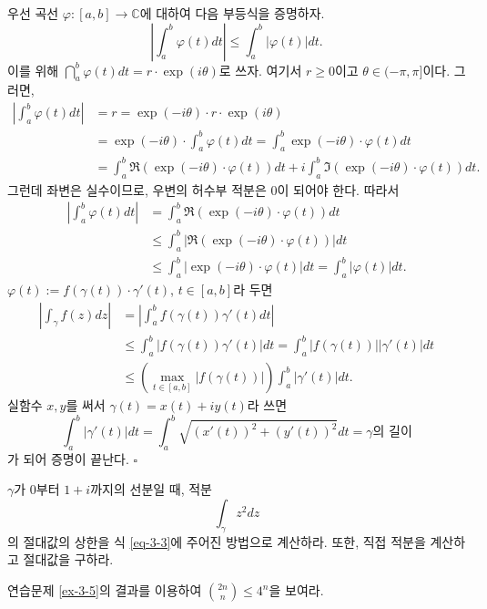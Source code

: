 우선 곡선 $\varphi : [a,b] \to \mathbb C$에 대하여 다음 부등식을 증명하자.
\[
\left| \int_a^b \varphi(t)dt \right|
\le \int_a^b |\varphi(t)|dt.
\]
이를 위해 $\dint_a^b \varphi(t) dt = r\cdot \exp(i\theta)$로 쓰자.
여기서 $r\ge 0$이고 $\theta \in (-\pi, \pi]$이다.
그러면,
\begin{align*}
\left| \int_a^b \varphi(t)dt \right|
&= r = \exp(-i\theta)\cdot r \cdot \exp(i\theta) \\
&= \exp(-i\theta) \cdot \int_a^b \varphi(t)dt
= \int_a^b \exp(-i\theta) \cdot \varphi(t)dt \\
&= \int_a^b \Re(\exp(-i\theta)\cdot\varphi(t))dt
+ i \int_a^b \Im(\exp(-i\theta)\cdot\varphi(t))dt.
\end{align*}
그런데 좌변은 실수이므로, 우변의 허수부 적분은 $0$이 되어야 한다.
따라서 
\begin{align*}
\left| \int_a^b \varphi(t)dt \right|
&= \int_a^b \Re(\exp(-i\theta)\cdot\varphi(t))dt \\
&\le \int_a^b |\Re(\exp(-i\theta)\cdot\varphi(t))|dt \\
&\le \int_a^b | \exp(-i\theta) \cdot \varphi(t)| dt
= \int_a^b |\varphi(t)| dt. 
\end{align*}
$\varphi(t) := f(\gamma(t))\cdot \gamma'(t)$, $t\in[a,b]$라 두면
\begin{align*}
\left| \int_\gamma f(z)dz \right| 
&= \left| \int_a^b f(\gamma(t)) \gamma'(t) dt \right| \\
&\le \int_a^b |f(\gamma(t)) \gamma'(t)| dt
= \int_a^b |f(\gamma(t))| | \gamma'(t)| dt \\
&\le \left( \max_{t\in[a,b]} |f(\gamma(t))| \right) 
\int_a^b |\gamma'(t)|dt.
\end{align*}
실함수 $x, y$를 써서  $\gamma(t) = x(t) + iy(t)$라 쓰면
\[
\int_a^b |\gamma'(t)|dt 
= \int_a^b  \sqrt{ (x'(t))^2 + (y'(t))^2} dt
= \gamma \text{의 길이}
\]
가 되어 증명이 끝난다.
\hfill $\square$

\begin{salt_exercise} \label{ex-3-9}
$\gamma$가 $0$부터 $1+i$까지의 선분일 때,
적분 
\[
\int_\gamma z^2dz
\] 
의 절대값의 상한을 식 \eqref{eq-3-3}에 주어진 방법으로 계산하라.
또한, 직접 적분을 계산하고 절대값을 구하라.
\end{salt_exercise}

\begin{salt_exercise} \label{ex-3-10}
연습문제 \ref{ex-3-5}의 결과를 이용하여
$\displaystyle{2n \choose n} \le 4^n$을 보여라.
\end{salt_exercise}

